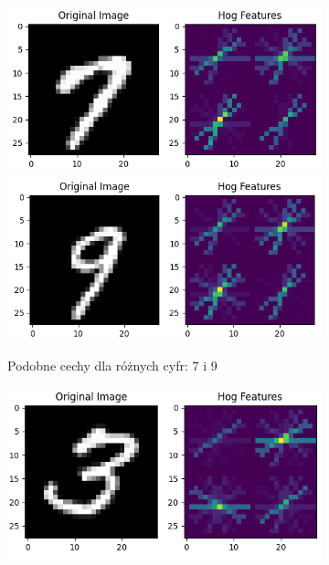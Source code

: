\documentclass[10pt]{article}
\begin{document}
\begin{figure}[H]\centering
    \begin{subfigure}[t]{.2\textwidth}
        \includegraphics[width=\linewidth]{img/hog_similar/7.png}
        \includegraphics[width=\linewidth]{img/hog_similar/9.png}
        \caption{Podobne cechy dla różnych cyfr: 7 i 9}
    \end{subfigure}
    \hspace{.1\textwidth}
    \begin{subfigure}[t]{.2\textwidth}
        \includegraphics[width=\linewidth]{img/hog_similar/3.png}

\end{subfigure}
\end{figure}
\end{document}
